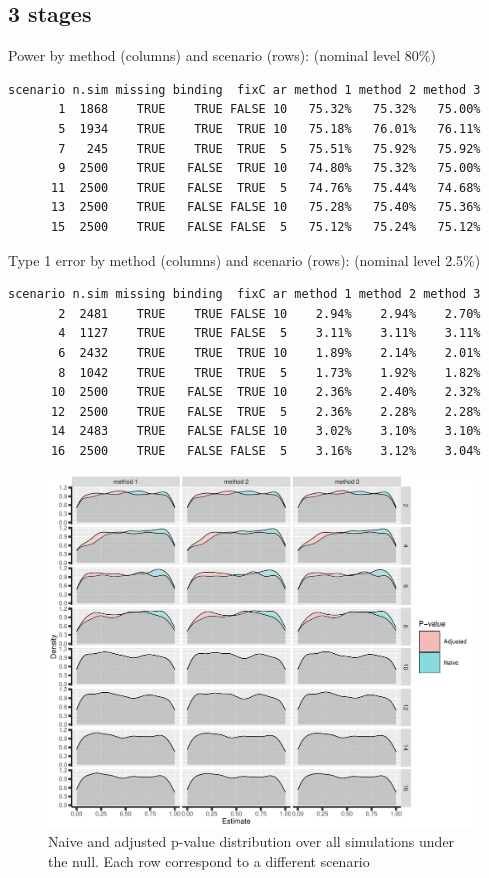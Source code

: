 \documentclass[12pt]{article}
\begin{document}
\clearpage

\subsection{3 stages}
\label{sec:org7c6c38a}
Power by method (columns) and scenario (rows): \hfill (nominal level 80\%)
\begin{verbatim}
scenario n.sim missing binding  fixC ar method 1 method 2 method 3
       1  1868    TRUE    TRUE FALSE 10   75.32%   75.32%   75.00%
       5  1934    TRUE    TRUE  TRUE 10   75.18%   76.01%   76.11%
       7   245    TRUE    TRUE  TRUE  5   75.51%   75.92%   75.92%
       9  2500    TRUE   FALSE  TRUE 10   74.80%   75.32%   75.00%
      11  2500    TRUE   FALSE  TRUE  5   74.76%   75.44%   74.68%
      13  2500    TRUE   FALSE FALSE 10   75.28%   75.40%   75.36%
      15  2500    TRUE   FALSE FALSE  5   75.12%   75.24%   75.12%
\end{verbatim}


\bigskip

Type 1 error by method (columns) and scenario (rows): \hfill (nominal level 2.5\%)
\begin{verbatim}
scenario n.sim missing binding  fixC ar method 1 method 2 method 3
       2  2481    TRUE    TRUE FALSE 10    2.94%    2.94%    2.70%
       4  1127    TRUE    TRUE FALSE  5    3.11%    3.11%    3.11%
       6  2432    TRUE    TRUE  TRUE 10    1.89%    2.14%    2.01%
       8  1042    TRUE    TRUE  TRUE  5    1.73%    1.92%    1.82%
      10  2500    TRUE   FALSE  TRUE 10    2.36%    2.40%    2.32%
      12  2500    TRUE   FALSE  TRUE  5    2.36%    2.28%    2.28%
      14  2483    TRUE   FALSE FALSE 10    3.02%    3.10%    3.10%
      16  2500    TRUE   FALSE FALSE  5    3.16%    3.12%    3.04%
\end{verbatim}


\clearpage

\begin{figure}[!h]
\centering
\includegraphics[trim={0 0 0 0},width=1\textwidth]{./figures/gg3stage-pvalue-density.pdf}
\caption{Naive and adjusted p-value distribution over all simulations under the null. Each row correspond to a different scenario}
\end{figure}
\end{document}
